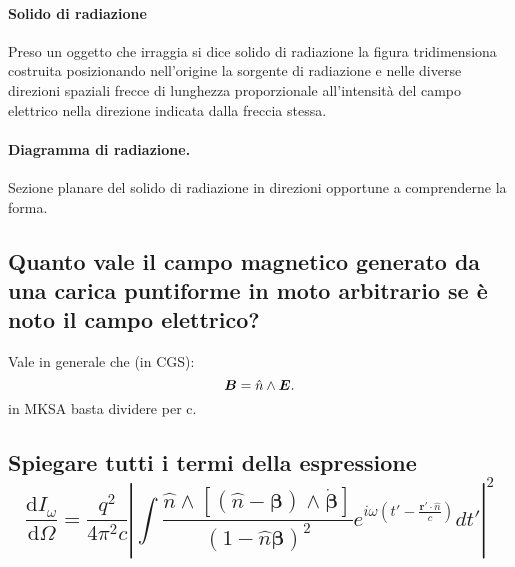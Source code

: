 \paragraph{Solido di radiazione}
\label{par:Solido di radiazione.}
Preso un oggetto che irraggia si dice solido di radiazione la figura tridimensiona costruita posizionando nell'origine la sorgente di radiazione e nelle diverse direzioni spaziali frecce di lunghezza proporzionale all'intensità del campo elettrico nella direzione indicata dalla freccia stessa.

\paragraph{Diagramma di radiazione.}%
\label{par:Diagramma di radiazione.}
Sezione planare del solido di radiazione in direzioni opportune a comprenderne la forma. 

\subsection[\hspace{1mm} Campo magnetico in funzione del campo elettrico per carica puntiforme]{Quanto vale il campo magnetico generato da una carica puntiforme in moto arbitrario se è noto il campo elettrico?}
\label{sec:3.a.13}
Vale in generale che (in CGS):
\[
	\boldsymbol{B}= \hat{n} \wedge \boldsymbol{E} 
.\]
in MKSA basta dividere per c.
\subsection[\hspace{1mm} Distribuzione angolare di energia irraggiata per unità di frequenza]{Spiegare tutti i termi della espressione 
\[
	\frac{\mbox{d} I_{\omega}}{\mbox{d} \Omega} = \frac{q^2}{4 \pi^2 c} \left| \int{ \frac{\hat{n} \wedge \left[ \left( \hat{n}-\boldsymbol{\beta}\right) \wedge \dot{\boldsymbol{\beta}} \right]}{\left( 1- \hat{n} \boldsymbol{\beta}\right)^2} e^{i\omega \left( t' - \frac{\boldsymbol{r'} \cdot \hat{n}}{c} \right) }  } dt' \right|^2
\] 
}

